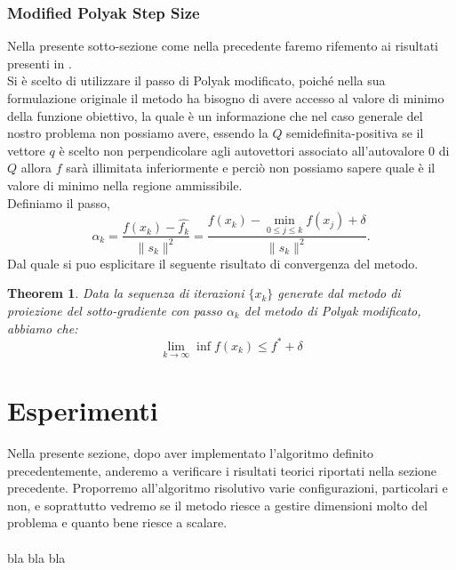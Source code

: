 \documentclass{article}
\newtheorem{theorem}{Theorem}[section]
\begin{document}
\subsubsection{Modified Polyak Step Size}
Nella presente sotto-sezione come nella precedente faremo rifemento ai risultati presenti in \cite{sgd_notes}.\\
Si è scelto di utilizzare il passo di Polyak modificato, poiché nella sua formulazione originale il metodo ha bisogno di avere accesso al valore di minimo della funzione obiettivo, la quale è un informazione che nel caso generale del nostro problema non possiamo avere, essendo la $Q$ semidefinita-positiva se il vettore $q$ è scelto non perpendicolare agli autovettori associato all'autovalore 0 di $Q$ allora $f$ sarà illimitata inferiormente e perciò non possiamo sapere quale è il valore di minimo nella regione ammissibile.\\
Definiamo il passo,
\[\alpha_k = \frac{f(x_k) - \hat{f_k}}{\|s_k\|^2} = \frac{f(x_k) - \min_{0 \leq j \leq k} f(x_j) + \delta}{\|s_k\|^2}.\]
Dal quale si puo esplicitare il seguente risultato di convergenza del metodo.
\begin{theorem}
Data la sequenza di iterazioni $\{x_k\}$ generate dal metodo di proiezione del sotto-gradiente con passo $\alpha_k$ del metodo di Polyak modificato, abbiamo che:
\[\lim_{k \to \infty} \inf f(x_k) \leq f^* + \delta\]
\end{theorem}
\section{Esperimenti}
Nella presente sezione, dopo aver implementato l'algoritmo definito precedentemente, anderemo a verificare i risultati teorici riportati nella sezione precedente. Proporremo all'algoritmo risolutivo varie configurazioni, particolari e non, e soprattutto vedremo se il metodo riesce a gestire dimensioni molto del problema e quanto bene riesce a scalare.\\\\
bla bla bla


\end{document}
